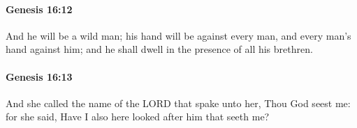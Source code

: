 		\paragraph{Genesis 16:12} %
			\label{GENESIS-16-12}

			And he will be a wild man; his hand will be against every man, and every man's hand against him; and he shall dwell in the presence of all his brethren.


		\paragraph{Genesis 16:13} %
			\label{GENESIS-16-13}

			And she called the name of the LORD that spake unto her, Thou God seest me: for she said, Have I also here looked after him that seeth me?


